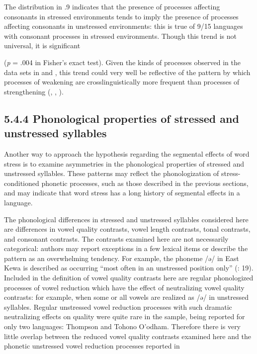   The distribution in .9 indicates that the presence of processes affecting consonants in stressed environments tends to imply the presence of processes affecting consonants in unstressed environments: this is true of 9/15 languages with consonant processes in stressed environments. Though this trend is not universal, it is significant 



(\textit{p} = .004 in Fisher’s exact test). Given the kinds of processes observed in the data sets in  and , this trend could very well be reflective of the pattern by which processes of weakening are crosslinguistically more frequent than processes of strengthening (\citealt{BybeeEasterday2019}, \citealt{Bybee2015b}, \citealt{Lavoie2015}).


\subsection{5.4.4 Phonological properties of stressed and unstressed syllables}

  Another way to approach the hypothesis regarding the segmental effects of word stress is to examine asymmetries in the phonological properties of stressed and unstressed syllables. These patterns may reflect the phonologization of stress-conditioned phonetic processes, such as those described in the previous sections, and may indicate that word stress has a long history of segmental effects in a language.



  The phonological differences in stressed and unstressed syllables considered here are differences in vowel quality contrasts, vowel length contrasts, tonal contrasts, and consonant contrasts. The contrasts examined here are not necessarily categorical: authors may report exceptions in a few lexical items or describe the pattern as an overwhelming tendency. For example, the phoneme /ə/ in East Kewa is described as occurring “most often in an unstressed position only” (\citealt{FranklinFranklin1978}: 19). Included in the definition of vowel quality contrasts here are regular phonologized processes of vowel reduction which have the effect of neutralizing vowel quality contrasts: for example, when some or all vowels are realized as /ə/ in unstressed syllables. Regular unstressed vowel reduction processes with such dramatic neutralizing effects on quality were quite rare in the sample, being reported for only two languages: Thompson and Tohono O’odham. Therefore there is very little overlap between the reduced vowel quality contrasts examined here and the phonetic unstressed vowel reduction processes reported in 



